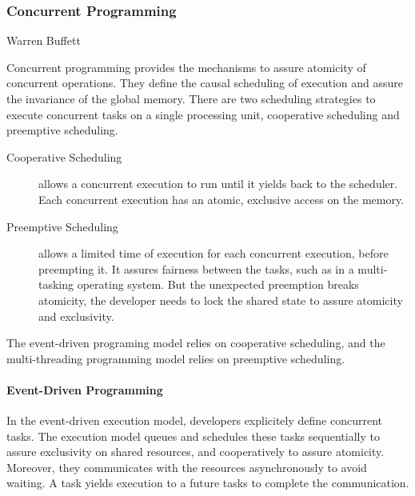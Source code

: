 \subsubsection{Concurrent Programming} \label{chapter3:software-efficiency:concurrency:concurrent-programming}


{Warren Buffett}

Concurrent programming provides the mechanisms to assure atomicity of concurrent operations.
They define the causal scheduling of execution and assure the invariance of the global memory.
There are two scheduling strategies to execute concurrent tasks on a single processing unit, cooperative scheduling and preemptive scheduling.

\begin{description}
\item[Cooperative Scheduling] allows a concurrent execution to run until it yields back to the scheduler.
Each concurrent execution has an atomic, exclusive access on the memory.
\item[Preemptive Scheduling] allows a limited time of execution for each concurrent execution, before preempting it.
It assures fairness between the tasks, such as in a multi-tasking operating system.
But the unexpected preemption breaks atomicity, the developer needs to lock the shared state to assure atomicity and exclusivity.
\end{description}

The event-driven programing model relies on cooperative scheduling, and the multi-threading programming model relies on preemptive scheduling.

\paragraph{Event-Driven Programming}

In the event-driven execution model, developers explicitely define concurrent tasks.
The execution model queues and schedules these tasks sequentially to assure exclusivity on shared resources, and cooperatively to assure atomicity.
Moreover, they communicates with the resources asynchronously to avoid waiting.
A task yields execution to a future tasks to complete the communication.

